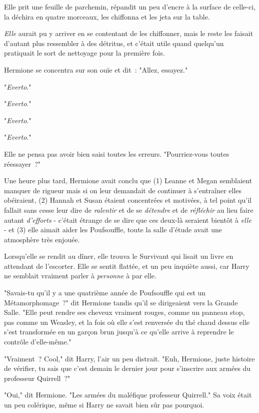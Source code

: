 Elle prit une feuille de parchemin, répandit un peu d'encre à la surface de celle-ci, la déchira en quatre morceaux, les chiffonna et les jeta sur la table.

\emph{Elle} aurait pu y arriver en se contentant de les chiffonner, mais le reste les faisait d'autant plus ressembler à des détritus, et c'était utile quand quelqu'un pratiquait le sort de nettoyage pour la première fois.

Hermione se concentra sur son ouïe et dit~: "Allez, essayez."

"\emph{Everto}."

"\emph{Everto}."

"\emph{Everto}."

"\emph{Everto}."

Elle ne pensa pas avoir bien saisi toutes les erreurs. "Pourriez-vous toutes réessayer~?"

Une heure plus tard, Hermione avait conclu que (1) Leanne et Megan semblaient manquer de rigueur mais si on leur demandait de continuer à s'entraîner elles obéiraient, (2) Hannah et Susan étaient concentrées et motivées, à tel point qu'il fallait sans cesse leur dire de \emph{ralentir} et de se \emph{détendre} et de \emph{réfléchir} au lieu faire autant \emph{d'efforts} - c'était étrange de se dire que ces deux-là seraient bientôt à \emph{elle} - et (3) elle aimait aider les Poufsouffle, toute la salle d'étude avait une atmosphère très enjouée.

Lorsqu'elle se rendit au dîner, elle trouva le Survivant qui lisait un livre en attendant de l'escorter. Elle se sentit flattée, et un peu inquiète aussi, car Harry ne semblait vraiment parler à \emph{personne} à par elle.

"Savais-tu qu'il y a une quatrième année de Poufsouffle qui est un Métamorphomage~?" dit Hermione tandis qu'il se dirigeaient vers la Grande Salle. "Elle peut rendre ses cheveux vraiment rouges, comme un panneau stop, pas comme un Weasley, et la fois où elle s'est renversée du thé chaud dessus elle s'est transformée en un garçon brun jusqu'à ce qu'elle arrive à reprendre le contrôle d'elle-même."

"Vraiment~? Cool," dit Harry, l'air un peu distrait. "Euh, Hermione, juste histoire de vérifier, tu sais que c'est demain le dernier jour pour s'inscrire aux armées du professeur Quirrell~?"

"Oui," dit Hermione. "Les armées du maléfique professeur Quirrell." Sa voix était un peu colérique, même si Harry ne savait bien sûr pas pourquoi.

